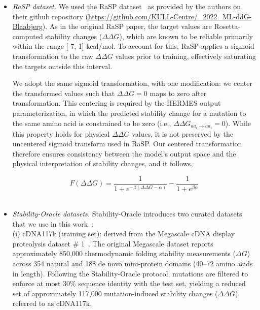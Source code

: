 \begin{itemize}
\item {\em RaSP dataset.} We used the RaSP dataset~\citep{blaabjerg_rapid_2023} as provided by the
authors on their github repository (\url{https://github.com/KULL-Centre/_2022_ML-ddG-Blaabjerg}). As
in the original RaSP paper, the target values are Rosetta-computed stability changes ($\Delta\Delta
G$), which are known to be reliable primarily within the range [-7, 1] kcal/mol. To account for
this, RaSP applies a sigmoid transformation to the raw $\Delta\Delta G$ values prior to training,
effectively saturating the targets outside this interval.

We adopt the same sigmoid transformation, with one modification: we center the transformed values
such that $\Delta\Delta G = 0$ maps to zero after transformation. This centering is required by the
HERMES output parameterization, in which the predicted stability change for a mutation to the same
amino acid is constrained to be zero (i.e., $\Delta\Delta G_{aa_i \rightarrow aa_i} = 0$). While
this property holds for physical $\Delta\Delta G$ values, it is not preserved by the uncentered
sigmoid transform used in RaSP. Our centered transformation therefore ensures consistency between
the model's output space and the physical interpretation of stability changes, and it follows,

\begin{equation}
    F(\Delta\Delta G) = \frac{1}{1 + e^{-\beta(\Delta\Delta G - \alpha)}} - \frac{1}{1 + e^{\beta
    \alpha}}
    \label{eq:centered_fermi_transform}
\end{equation}\\

\item {\em Stability-Oracle datasets.} Stability-Oracle introduces two curated datasets that we use
in this work~\citep{diaz_stability_2024}:\\

(i) {cDNA117k} (training set): derived from the Megascale cDNA display proteolysis dataset \#
1~\citep{tsuboyama_mega-scale_2023}. The original Megascale dataset reports approximately 850,000
thermodynamic folding stability measurements ($\Delta G$) across 354 natural and 188 de novo
mini-protein domains (40–72 amino acids in length). Following the Stability-Oracle protocol,
mutations are filtered to enforce at most 30\% sequence identity with the test set, yielding a
reduced set of approximately 117,000 mutation-induced stability changes ($\Delta\Delta G$), referred
to as cDNA117k.\\


\end{itemize}
